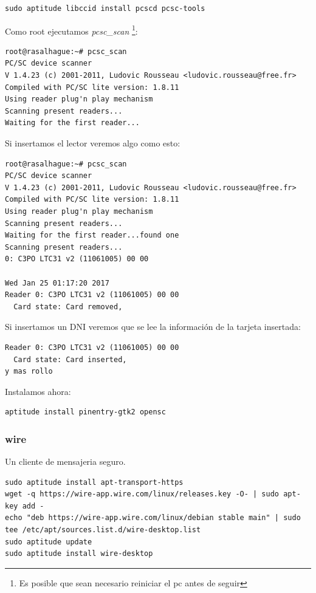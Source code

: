 \documentclass[12pt,spanish,]{scrartcl}
\begin{document}
\begin{verbatim}
sudo aptitude libccid install pcscd pcsc-tools
\end{verbatim}

Como root ejecutamos \emph{pcsc\_scan} \footnote{Es posible que sean
  necesario reiniciar el pc antes de seguir}:

\begin{verbatim}
root@rasalhague:~# pcsc_scan 
PC/SC device scanner
V 1.4.23 (c) 2001-2011, Ludovic Rousseau <ludovic.rousseau@free.fr>
Compiled with PC/SC lite version: 1.8.11
Using reader plug'n play mechanism
Scanning present readers...
Waiting for the first reader...
\end{verbatim}

Si insertamos el lector veremos algo como esto:

\begin{verbatim}
root@rasalhague:~# pcsc_scan 
PC/SC device scanner
V 1.4.23 (c) 2001-2011, Ludovic Rousseau <ludovic.rousseau@free.fr>
Compiled with PC/SC lite version: 1.8.11
Using reader plug'n play mechanism
Scanning present readers...
Waiting for the first reader...found one
Scanning present readers...
0: C3PO LTC31 v2 (11061005) 00 00

Wed Jan 25 01:17:20 2017
Reader 0: C3PO LTC31 v2 (11061005) 00 00
  Card state: Card removed, 
\end{verbatim}

Si insertamos un DNI veremos que se lee la información de la tarjeta
insertada:

\begin{verbatim}
Reader 0: C3PO LTC31 v2 (11061005) 00 00
  Card state: Card inserted, 
y mas rollo
\end{verbatim}

Instalamos ahora:

\begin{verbatim}
aptitude install pinentry-gtk2 opensc
\end{verbatim}

\hypertarget{wire}{%
\subsubsection{wire}\label{wire}}

Un cliente de mensajeria seguro.

\begin{verbatim}
sudo aptitude install apt-transport-https
wget -q https://wire-app.wire.com/linux/releases.key -O- | sudo apt-key add -
echo "deb https://wire-app.wire.com/linux/debian stable main" | sudo tee /etc/apt/sources.list.d/wire-desktop.list
sudo aptitude update
sudo aptitude install wire-desktop
\end{verbatim}
\end{document}
